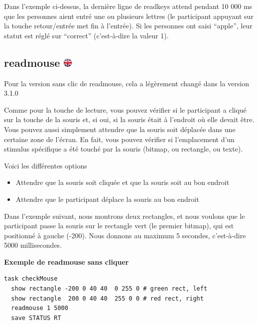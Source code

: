 \documentclass[
]{book}
\providecommand{\tightlist}{%
  \setlength{\itemsep}{0pt}\setlength{\parskip}{0pt}}
\begin{document}
Dans l'exemple ci-dessus, la dernière ligne de readkeys attend pendant
10 000 ms que les personnes aient entré une ou plusieurs lettres (le
participant appuyant sur la touche retour/entrée met fin à l'entrée). Si
les personnes ont saisi ``apple'', leur statut est réglé sur ``correct''
(c'est-à-dire la valeur 1).

\hypertarget{readmouse}{%
\subsection[readmouse ]{\texorpdfstring{readmouse
\href{https://www.psytoolkit.org/doc3.2.0/syntax.html\#task-readmouse}{\protect\includegraphics{img/ukflag.png}}}{readmouse }}\label{readmouse}}

Pour la version sans clic de readmouse, cela a légèrement changé dans la
version 3.1.0

Comme pour la touche de lecture, vous pouvez vérifier si le participant
a cliqué sur la touche de la souris et, si oui, si la souris était à
l'endroit où elle devait être. Vous pouvez aussi simplement attendre que
la souris soit déplacée dans une certaine zone de l'écran. En fait, vous
pouvez vérifier si l'emplacement d'un stimulus spécifique a été touché
par la souris (bitmap, ou rectangle, ou texte).

Voici les différentes options

\begin{itemize}
\tightlist
\item
  Attendre que la souris soit cliquée et que la souris soit au bon
  endroit
\item
  Attendre que le participant déplace la souris au bon endroit
\end{itemize}

Dans l'exemple suivant, nous montrons deux rectangles, et nous voulons
que le participant passe la souris sur le rectangle vert (le premier
bitmap), qui est positionné à gauche (-200). Nous donnons au maximum 5
secondes, c'est-à-dire 5000 millisecondes.

\textbf{Exemple de readmouse sans cliquer}

\begin{verbatim}
task checkMouse
  show rectangle -200 0 40 40  0 255 0 # green rect, left
  show rectangle  200 0 40 40  255 0 0 # red rect, right
  readmouse 1 5000
  save STATUS RT
\end{verbatim}
\end{document}
